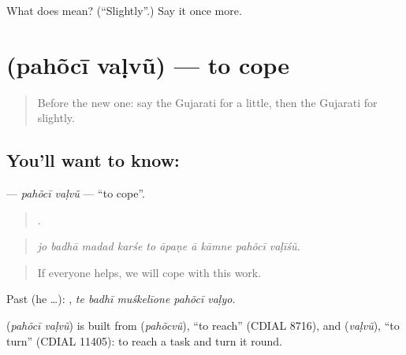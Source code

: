 \begin{tcolorbox}[breakable,colback=teal!4,colframe=teal!35!black,title={Before you move on}]
What does  mean? (\textquotedblleft{}Slightly\textquotedblright{}.) Say it once more.
\end{tcolorbox}
\section[\texorpdfstring{\gu{પહોંચી} \gu{વળવું} (pahõcī vaḷvũ)}{પહોંચી વળવું (pahõcī vaḷvũ)}]{  (pahõcī vaḷvũ) — to cope}

\label{lesson:GU-C380-pahoci-valvu}



\begin{quote}
Before the new one: say the Gujarati for a little, then the Gujarati for slightly.
\end{quote}

\subsection*{You'll want to know:  }
\textbf{ } — \emph{pahõcī vaḷvũ} — \textquotedblleft{}to cope\textquotedblright{}.

\begin{quote}
         .
\end{quote}

\begin{quote}
\emph{jo badhā madad karśe to āpaṇe ā kāmne pahõcī vaḷīśũ.}
\end{quote}

\begin{quote}
If everyone helps, we will cope with this work.
\end{quote}

Past (he …):     , \emph{te badhī muśkelīone pahõcī vaḷyo}.

\begin{cousinweb}
\textbf{ } (\emph{pahõcī vaḷvũ}) is built from \textbf{} (\emph{pahõcvũ}), \textquotedblleft{}to reach\textquotedblright{} (CDIAL 8716), and \textbf{} (\emph{vaḷvũ}), \textquotedblleft{}to turn\textquotedblright{} (CDIAL 11405): to reach a task and turn it round.
\end{cousinweb}

